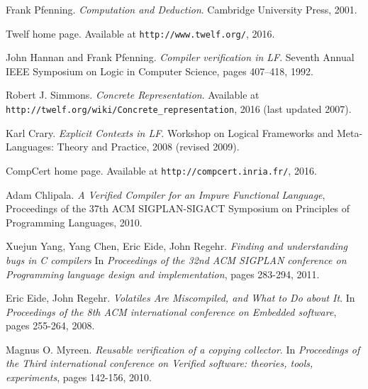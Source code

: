 \clearpage

\begin{thebibliography}{9}

Frank Pfenning.
\textit{Computation and Deduction}.
Cambridge University Press, 2001.

Twelf home page. Available at \texttt{http://www.twelf.org/}, 2016.

John Hannan and Frank Pfenning.
\textit{Compiler verification in LF}.
Seventh Annual IEEE Symposium on Logic in Computer Science, pages 407–418, 1992.

Robert J. Simmons.
\textit{Concrete Representation}.
Available at \texttt{http://twelf.org/wiki/Concrete\_representation}, 2016 (last updated 2007).

Karl Crary.
\textit{Explicit Contexts in LF}.
Workshop on Logical Frameworks and Meta-Languages: Theory and Practice, 2008 (revised 2009).

CompCert home page. Available at \texttt{http://compcert.inria.fr/}, 2016.

Adam Chlipala.
\textit{A Verified Compiler for an Impure Functional Language},
Proceedings of the 37th ACM SIGPLAN-SIGACT Symposium on Principles of Programming Languages, 2010.

Xuejun Yang, Yang Chen, Eric Eide, John Regehr.
\textit{Finding and understanding bugs in C compilers}
In \textit{Proceedings of the 32nd ACM SIGPLAN conference on Programming language design and implementation}, pages 283-294, 2011.

Eric Eide, John Regehr.
\textit{Volatiles Are Miscompiled, and What to Do about It}.
In \textit{Proceedings of the 8th ACM international conference on Embedded software}, pages 255-264, 2008.

Magnus O. Myreen.
\textit{Reusable verification of a copying collector}.
In \textit{Proceedings of the Third international conference on Verified software: theories, tools, experiments}, pages 142-156, 2010.

\end{thebibliography}

